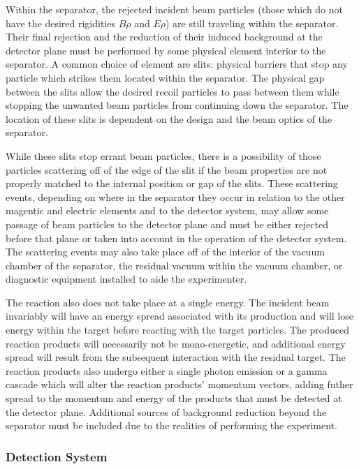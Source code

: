 Within the separator, the rejected incident beam particles (those which do not
have the desired rigidities $B\rho$ and $E\rho$) are still traveling within
the separator. Their final rejection and the reduction of their induced
background at the detector plane must be performed by some physical element
interior to the separator. A common choice of element are slits: physical
barriers that stop any particle which strikes them located within the
separator. The physical gap between the slits allow the desired recoil
particles to pass between them while stopping the unwanted beam particles from
continuing down the separator. The location of these slits is dependent on the
design and the beam optics of the separator.

While these slits stop errant beam particles, there is a possibility of those
particles scattering off of the edge of the slit if the beam properties are
not properly matched to the internal position or gap of the slits. These
scattering events, depending on where in the separator they occur in relation
to the other magentic and electric elements and to the detector system, may
allow some passage of beam particles to the detector plane and must be either
rejected before that plane or taken into account in the operation of the
detector system. The scattering events may also take place off of the interior
of the vacuum chamber of the separator, the residual vacuum within the vacuum
chamber, or diagnostic equipment installed to aide the experimenter.

The reaction also does not take place at a single energy. The incident beam
invariably will have an energy spread associated with its production and will
lose energy within the target before reacting with the target particles. The
produced reaction products will necessarily not be mono-energetic, and
additional energy spread will result from the subsequent interaction with the
residual target. The reaction products also undergo either a single photon
emission or a gamma cascade which will alter the reaction products' momentum
vectors, adding futher spread to the momentum and energy of the products that
must be detected at the detector plane. Additional sources of background
reduction beyond the separator must be included due to the realities of
performing the experiment.


\subsubsection{Detection System}

